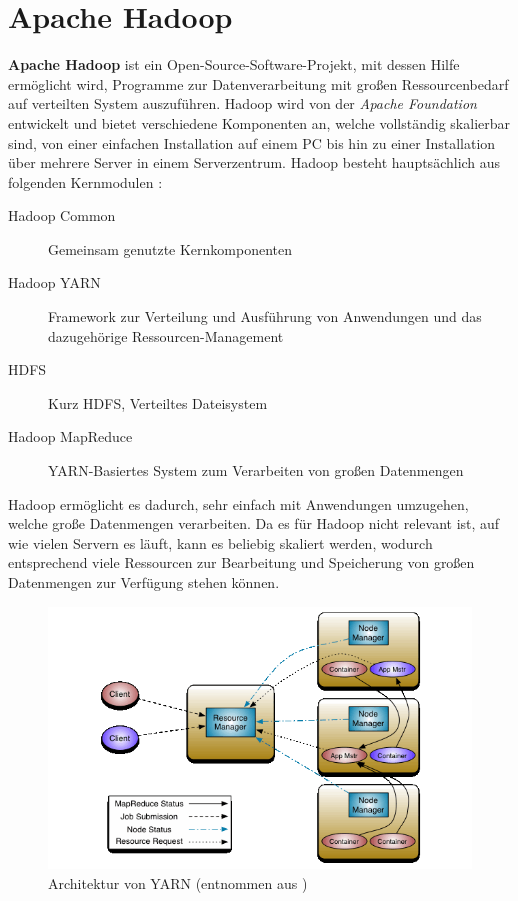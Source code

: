 \section{Apache Hadoop}\label{sec:hadoop}

\textbf{Apache Hadoop} ist ein Open-Source-Software-Projekt, mit dessen Hilfe ermöglicht wird, Programme zur Datenverarbeitung mit großen Ressourcenbedarf auf verteilten System auszuführen. Hadoop wird von der \emph{Apache Foundation} entwickelt und bietet verschiedene Komponenten an, welche vollständig skalierbar sind, von einer einfachen Installation auf einem PC bis hin zu einer Installation über mehrere Server in einem Serverzentrum. Hadoop besteht hauptsächlich aus folgenden Kernmodulen \cite{HadoopHomePage}:

\begin{description}
	\item[Hadoop Common] Gemeinsam genutzte Kernkomponenten
	\item[Hadoop YARN] Framework zur Verteilung und Ausführung von Anwendungen und das dazugehörige Ressourcen-Management
	\item[\acl{HDFS}] Kurz \acs{HDFS}, Verteiltes Dateisystem
	\item[Hadoop MapReduce] YARN-Basiertes System zum Verarbeiten von großen Datenmengen
\end{description}

Hadoop ermöglicht es dadurch, sehr einfach mit Anwendungen umzugehen, welche große Datenmengen verarbeiten. Da es für Hadoop nicht relevant ist, auf wie vielen Servern es läuft, kann es beliebig skaliert werden, wodurch entsprechend viele Ressourcen zur Bearbeitung und Speicherung von großen Datenmengen zur Verfügung stehen können.

\begin{figure}
	\includegraphics{./images/yarn_architecture.png}
	\caption[Architektur von YARN]{Architektur von YARN (entnommen aus \cite{HadoopYarnArch271})}
	\label{fig:yarnarch}
\end{figure}

